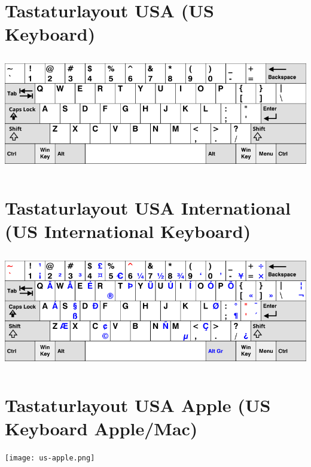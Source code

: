 \documentclass[10pt,a4paper]{article}
\begin{document}
\cheatsheet

\section{Tastaturlayout USA (US Keyboard)}
\begin{center}
  \includegraphics[height=5cm]{us.png}
\end{center}

\section{Tastaturlayout USA International (US International Keyboard)}
\begin{center}
  \includegraphics[height=5cm]{us-international.png}
\end{center}

\newpage
\cheatsheet

\section{Tastaturlayout USA Apple (US Keyboard Apple/Mac)}
\begin{center}
  \texttt{[image: us-apple.png]}
\end{center}
\end{document}
